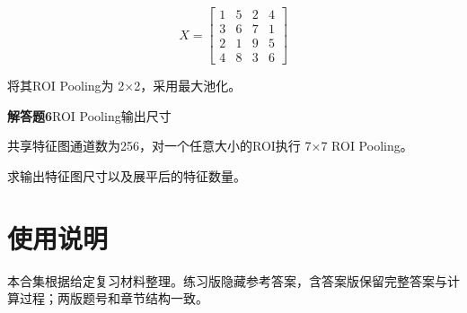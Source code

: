 \documentclass[UTF8,openany,oneside,zihao=-4,fontset=windows]{ctexbook}
\newif\ifshowsolutions
\newcommand{\Question}[2]{%
  \par\Needspace{4\baselineskip}\medskip
  \noindent\textbf{\color{MVBlue}#1}\quad #2\par
}
\newenvironment{AnswerBox}{\begin{tcolorbox}[breakable,colback=MVLight,colframe=MVBlue!45,title={参考答案},fonttitle=\bfseries,boxrule=0.55pt,arc=1.5mm,left=2mm,right=2mm,top=1.5mm,bottom=1.5mm]}{\end{tcolorbox}}
\newcommand{\PracticeSpace}[1]{\ifshowsolutions\else\par\vspace{#1}\par\fi}
\begin{document}
\[
X = \begin{bmatrix}
1 & 5 & 2 & 4 \\
3 & 6 & 7 & 1 \\
2 & 1 & 9 & 5 \\
4 & 8 & 3 & 6
\end{bmatrix}
\]
\par 将其ROI Pooling为 2×2，采用最大池化。
\ifshowsolutions
\begin{AnswerBox}
\par\noindent\textbf{左上区域：}
\begin{center}\small\ttfamily [[1, 5], [3, 6]]\end{center}
\par 最大值为6。
\par\noindent\textbf{右上区域：}
\begin{center}\small\ttfamily [[2, 1], [4, 8]]\end{center}
\par 最大值为8。
\par\noindent\textbf{左下区域：}
\begin{center}\small\ttfamily [[2, 4], [7, 1]]\end{center}
\par 最大值为7。
\par\noindent\textbf{右下区域：}
\begin{center}\small\ttfamily [[9, 5], [3, 6]]\end{center}
\par 最大值为9。
\par\noindent\textbf{所以输出为：}
\begin{center}\small\ttfamily [[6, 7], [8, 9]]\end{center}
\end{AnswerBox}
\else
\PracticeSpace{4.2cm}
\fi
\Question{解答题6}{ROI Pooling输出尺寸}
\par 共享特征图通道数为256，对一个任意大小的ROI执行 7×7 ROI Pooling。
\par 求输出特征图尺寸以及展平后的特征数量。
\ifshowsolutions
\begin{AnswerBox}
\par\noindent\textbf{ROI Pooling不改变通道数，所以输出为：}
\par 256×7×7
\par\noindent\textbf{展平后的特征数量为：}
\par 256×7×7=12544
\par\noindent\textbf{所以：}
\par 12544
\end{AnswerBox}
\else
\PracticeSpace{4.2cm}
\fi
\backmatter
\chapter*{使用说明}
本合集根据给定复习材料整理。练习版隐藏参考答案，含答案版保留完整答案与计算过程；两版题号和章节结构一致。
\end{document}
